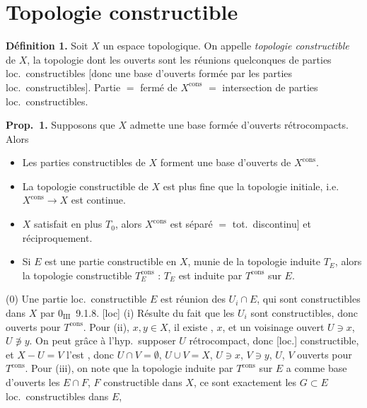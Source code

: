 \documentclass[11pt,a4paper]{article}
\begin{document}
\section{Topologie constructible}

\textbf{Définition 1.} Soit $X$ un espace topologique. On appelle \emph{topologie constructible} de $X$, \struck{\ill{}} la topologie dont les ouverts sont les réunions quelconques de parties loc.\ constructibles [donc une base d'ouverts formée par les parties loc.\ constructibles]. Partie  $=$ fermé de $X^{\mathrm{cons}}$ $=$ intersection de parties loc.\ constructibles.

\struck{\ill{}}

\textbf{Prop.~1.} Supposons que  $X$ admette une base  formée d'ouverts rétrocompacts. Alors
\begin{itemize}
\item[(0)] Les parties constructibles de $X$ forment une base d'ouverts de $X^{\mathrm{cons}}$.
\item[(i)] La topologie constructible de $X$ est plus fine que la topologie initiale, i.e.\ $X^{\mathrm{cons}}\to X$ est continue.
\item[(ii)]   $X$  satisfait en plus $T_0$, alors $X^{\mathrm{cons}}$ est séparé $=$ tot.\ discontinu] et réciproquement.
\item[(iii)] Si  $E$ est une  partie constructible en $X$, munie de la topologie induite $T_E$, alors la topologie constructible $T_E^{\mathrm{cons}}$ \ill{} : $T_E$ est induite par $T^{\mathrm{cons}}$ sur $E$.
\end{itemize}

(0) Une partie loc.\ constructible $E$ est réunion des $U_i\cap E$, qui sont constructibles dans $X$ par $0_{\mathrm{III}}$~9.1.8. [loc]
(i) Résulte du fait que les $U_i$ sont \add{[loc]} constructibles, donc ouverts pour $T^{\mathrm{cons}}$.
Pour (ii),  $x,y\in X$, il existe ,  $x$, et un voisinage ouvert $U\ni x$, $U\not\ni y$. On peut grâce à l'hyp.\ supposer $U$ rétrocompact, donc [loc.] constructible, et $X-U=V$ l'est  , donc $U\cap V=\emptyset$, $U\cup V=X$, $U\ni x$, $V\ni y$, $U$, $V$ ouverts pour $T^{\mathrm{cons}}$.
Pour (iii), on note que la topologie induite par $T^{\mathrm{cons}}$ sur $E$ a comme base d'ouverts les $E\cap F$, $F$   constructible dans $X$, ce sont exactement les $G\subset E$ loc.\ constructibles dans $E$,
\end{document}
